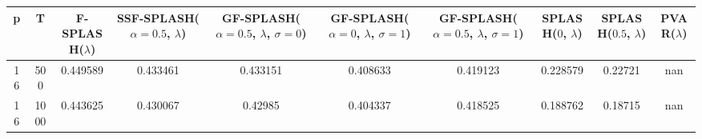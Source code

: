 \begin{tabular}{cccccccccc}
\hline
  p  &  T   &  F-SPLASH($\lambda$)  &  SSF-SPLASH($\alpha=0.5$, $\lambda$)  &  GF-SPLASH($\alpha=0.5$, $\lambda$, $\sigma=0$)  &  GF-SPLASH($\alpha=0$, $\lambda$, $\sigma=1$)  &  GF-SPLASH($\alpha=0.5$, $\lambda$, $\sigma=1$)  &  SPLASH($0$, $\lambda$)  &  SPLASH($0.5$, $\lambda$)  &  PVAR($\lambda$)  \\
\hline
 16  & 500  &       0.449589        &               0.433461                &                     0.433151                     &                    0.408633                    &                     0.419123                     &         0.228579         &          0.22721           &        nan        \\
 16  & 1000 &       0.443625        &               0.430067                &                     0.42985                      &                    0.404337                    &                     0.418525                     &         0.188762         &          0.18715           &        nan        \\
\hline
\end{tabular}